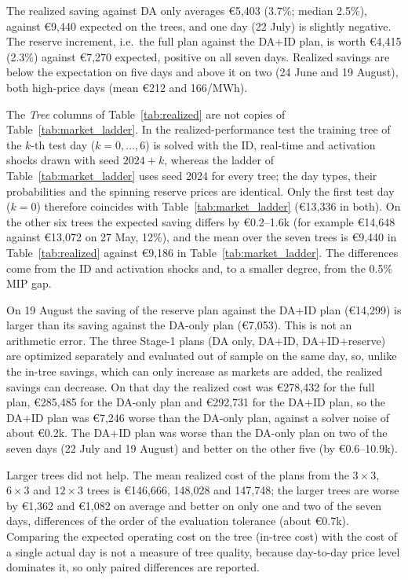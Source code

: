 \documentclass[5p,times,twocolumn]{elsarticle}
\begin{document}
The realized saving against DA only averages \euro 5,403 (3.7\%; median 2.5\%), against \euro 9,440 expected on the trees, and one day (22 July) is slightly negative. The reserve increment, i.e.\ the full plan against the DA+ID plan, is worth \euro 4,415 (2.3\%) against \euro 7,270 expected, positive on all seven days. Realized savings are below the expectation on five days and above it on two (24 June and 19 August), both high-price days (mean \euro 212 and 166/MWh).

The \emph{Tree} columns of Table~\ref{tab:realized} are not copies of Table~\ref{tab:market_ladder}. In the realized-performance test the training tree of the $k$-th test day ($k=0,\dots,6$) is solved with the ID, real-time and activation shocks drawn with seed $2024+k$, whereas the ladder of Table~\ref{tab:market_ladder} uses seed 2024 for every tree; the day types, their probabilities and the spinning reserve prices are identical. Only the first test day ($k=0$) therefore coincides with Table~\ref{tab:market_ladder} (\euro 13,336 in both). On the other six trees the expected saving differs by \euro 0.2--1.6k (for example \euro 14,648 against \euro 13,072 on 27 May, 12\%), and the mean over the seven trees is \euro 9,440 in Table~\ref{tab:realized} against \euro 9,186 in Table~\ref{tab:market_ladder}. The differences come from the ID and activation shocks and, to a smaller degree, from the 0.5\% MIP gap.

On 19 August the saving of the reserve plan against the DA+ID plan (\euro 14,299) is larger than its saving against the DA-only plan (\euro 7,053). This is not an arithmetic error. The three Stage-1 plans (DA only, DA+ID, DA+ID+reserve) are optimized separately and evaluated out of sample on the same day, so, unlike the in-tree savings, which can only increase as markets are added, the realized savings can decrease. On that day the realized cost was \euro 278,432 for the full plan, \euro 285,485 for the DA-only plan and \euro 292,731 for the DA+ID plan, so the DA+ID plan was \euro 7,246 worse than the DA-only plan, against a solver noise of about \euro 0.2k. The DA+ID plan was worse than the DA-only plan on two of the seven days (22 July and 19 August) and better on the other five (by \euro 0.6--10.9k).


Larger trees did not help. The mean realized cost of the plans from the $3\times3$, $6\times3$ and $12\times3$ trees is \euro 146,666, 148,028 and 147,748; the larger trees are worse by \euro 1,362 and \euro 1,082 on average and better on only one and two of the seven days, differences of the order of the evaluation tolerance (about \euro 0.7k). Comparing the expected operating cost on the tree (in-tree cost) with the cost of a single actual day is not a measure of tree quality, because day-to-day price level dominates it, so only paired differences are reported.
\end{document}
